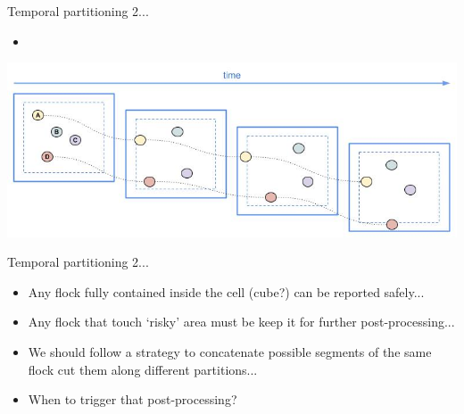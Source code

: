 \documentclass{beamer}
\begin{document}
\begin{frame}{Temporal partitioning 2...}
    \begin{itemize}
        \item %
    \end{itemize}

    \centering
    \includegraphics[width=\textwidth]{figures/temporal_phase_04.jpg}
\end{frame}

\begin{frame}{Temporal partitioning 2...}
    \begin{itemize}
        \item Any flock fully contained inside the cell (cube?) can be reported safely...
        \item Any flock that touch `risky' area must be keep it for further post-processing...
        \item We should follow a strategy to concatenate possible segments of the same flock cut them along different partitions...
        \item When to trigger that post-processing?
    \end{itemize}
\end{frame}


\end{document}
